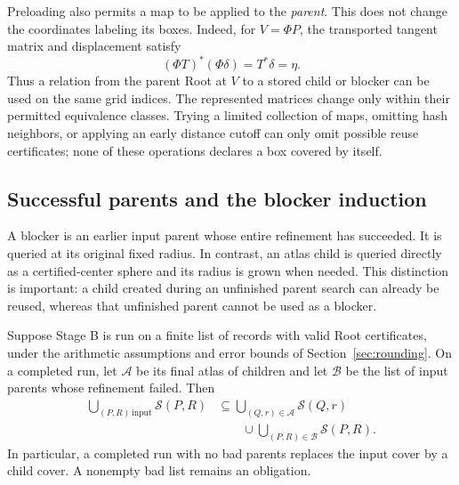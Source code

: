 Preloading also permits a map to be applied to the \emph{parent}.
This does not change the coordinates labeling its boxes.  Indeed, for
$V=\Phi P$, the transported tangent matrix and displacement satisfy
\begin{equation}\label{refine:mapped-coordinates}
 (\Phi T)^*(\Phi\delta)=T^*\delta=\eta.
\end{equation}
Thus a relation from the parent Root at $V$ to a stored child or blocker
can be used on the same grid indices.  The represented matrices change
only within their permitted equivalence classes.  Trying a limited
collection of maps, omitting hash neighbors, or applying an early
distance cutoff can only omit possible reuse certificates; none of
these operations declares a box covered by itself.

\subsection{Successful parents and the blocker induction}

A blocker is an earlier input parent whose entire refinement has
succeeded.  It is queried at its original fixed radius.  In contrast,
an atlas child is queried directly as a certified-center sphere and its
radius is grown when needed.  This distinction is important: a child
created during an unfinished parent search can already be reused,
whereas that unfinished parent cannot be used as a blocker.

\begin{proposition}\label{refine:cover-preservation}
Suppose Stage B is run on a finite list of records with valid Root
certificates, under the arithmetic assumptions and error bounds of
Section~\ref{sec:rounding}.  On a completed run, let $\mathcal A$ be its final atlas
of children and let $\mathcal B$ be the list of input parents whose
refinement failed.  Then
\begin{equation}\label{refine:cover-inclusion}
 \begin{split}
 \bigcup_{(P,R)\,\mathrm{input}}\mathcal S(P,R)
 &\subseteq
 \bigcup_{(Q,r)\in\mathcal A}\mathcal S(Q,r)\\
 &\qquad\cup
 \bigcup_{(P,R)\in\mathcal B}\mathcal S(P,R).
 \end{split}
\end{equation}
In particular, a completed run with no bad parents replaces the input
cover by a child cover.  A nonempty bad list remains an obligation.
\end{proposition}

